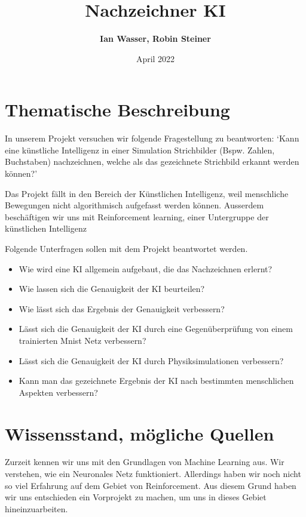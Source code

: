 \documentclass{article}
\title{\textbf{Nachzeichner KI}}
\author{\textbf{Ian Wasser, Robin Steiner}}
\date{April 2022}
\begin{document}
\maketitle

\tableofcontents

\pagebreak

\section{Thematische Beschreibung}
\label{chap:thematische-beschreibung}
In unserem Projekt versuchen wir folgende Fragestellung zu beantworten: `Kann
eine künstliche Intelligenz in einer Simulation Strichbilder (Bspw. Zahlen,
Buchstaben) nachzeichnen, welche als das gezeichnete Strichbild erkannt werden können?'

Das Projekt fällt in den Bereich der Künstlichen Intelligenz, weil menschliche
Bewegungen nicht algorithmisch aufgefasst werden können. Ausserdem beschäftigen
wir uns mit Reinforcement learning, einer Untergruppe der künstlichen
Intelligenz

Folgende Unterfragen sollen mit dem Projekt beantwortet werden.

\begin{itemize}
    \item Wie wird eine KI allgemein aufgebaut, die das Nachzeichnen erlernt?
    \item Wie lassen sich die Genauigkeit der KI beurteilen?
    \item Wie lässt sich das Ergebnis der Genauigkeit verbessern?
    \item Lässt sich die Genauigkeit der KI durch eine Gegenüberprüfung von einem trainierten Mnist Netz verbessern?
    \item Lässt sich die Genauigkeit der KI durch Physiksimulationen verbessern?
    \item Kann man das gezeichnete Ergebnis der KI nach bestimmten menschlichen Aspekten verbessern?
\end{itemize}

\section{Wissensstand, mögliche Quellen}
\label{chap:wissensstand}

Zurzeit kennen wir uns mit den Grundlagen von Machine Learning aus. Wir
verstehen, wie ein Neuronales Netz funktioniert. Allerdings haben wir noch nicht
so viel Erfahrung auf dem Gebiet von Reinforcement. Aus diesem Grund haben wir
uns entschieden ein Vorprojekt zu machen, um uns in dieses Gebiet
hineinzuarbeiten.
\end{document}
